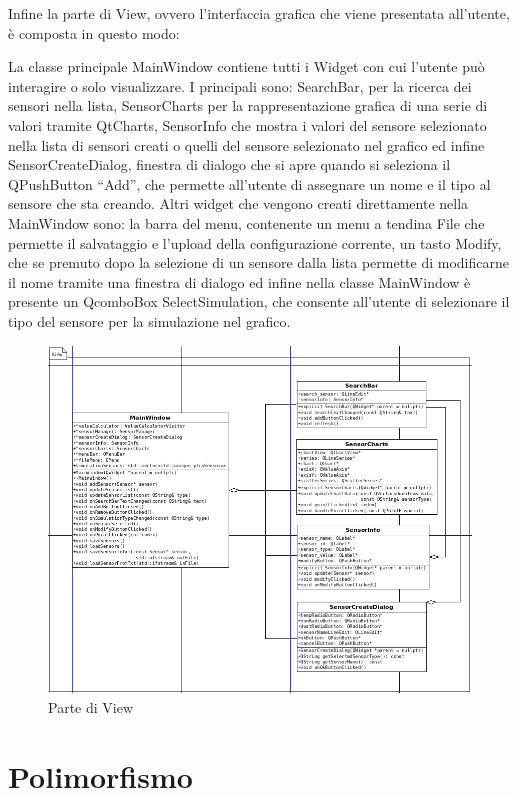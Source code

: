 \documentclass{article}
\begin{document}
Infine la parte di View, ovvero l’interfaccia grafica che viene presentata all’utente, è composta in questo modo:

La classe principale MainWindow contiene tutti i Widget con cui l’utente può interagire o solo visualizzare. I principali sono: SearchBar, per la ricerca dei sensori nella lista, SensorCharts per la rappresentazione grafica di una serie di valori tramite QtCharts, SensorInfo che mostra i valori del sensore selezionato nella lista di sensori creati o quelli del sensore selezionato nel grafico ed infine SensorCreateDialog, finestra di dialogo che si apre quando si seleziona il QPushButton “Add”, che permette all’utente di assegnare un nome e il tipo al sensore che sta creando.  Altri widget che vengono creati direttamente nella MainWindow sono: la barra del menu, contenente un menu a tendina File che permette il salvataggio e l’upload della configurazione corrente, un tasto Modify, che se premuto dopo la selezione di un sensore dalla lista permette di modificarne il nome tramite una finestra di dialogo ed infine nella classe MainWindow è presente un QcomboBox SelectSimulation, che consente all’utente di selezionare il tipo del sensore per la simulazione nel grafico.

\begin{figure}[H]
    \centering
    \includegraphics[width=\textwidth]{View.png}
    \caption{Parte di View}
    \label{fig:Parte di View}
\end{figure}

\section{Polimorfismo}
\end{document}

